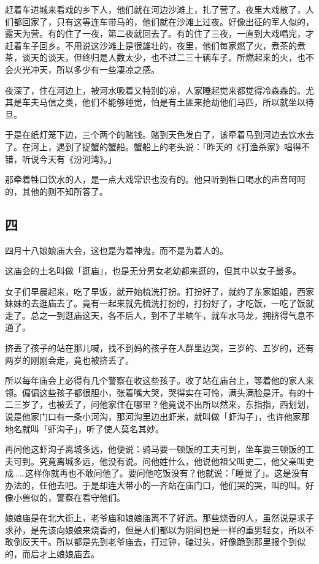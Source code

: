 \documentclass[UTF8]{ctexart}
\begin{document}
赶着车进城来看戏的乡下人，他们就在河边沙滩上，扎了营了。夜里大戏散了，人们都回家了，只有这等连车带马的，他们就在沙滩上过夜。好像出征的军人似的，露天为营。有的住了一夜，第二夜就回去了。有的住了三夜，一直到大戏唱完，才赶着车子回乡。不用说这沙滩上是很雄壮的，夜里，他们每家燃了火，煮茶的煮茶，谈天的谈天，但终归是人数太少，也不过二三十辆车子。所燃起来的火，也不会火光冲天，所以多少有一些凄凉之感。

夜深了，住在河边上，被河水吸着又特别的凉，人家睡起觉来都觉得冷森森的。尤其是车夫马信之类，他们不能够睡觉，怕是有土匪来抢劫他们马匹，所以就坐以待旦。

于是在纸灯笼下边，三个两个的赌钱。赌到天色发白了，该牵着马到河边去饮水去了。在河上，遇到了捉蟹的蟹船。蟹船上的老头说：「昨天的《打渔杀家》唱得不错，听说今天有《汾河湾》。」

那牵着牲口饮水的人，是一点大戏常识也没有的。他只听到牲口喝水的声音呵呵的，其他的则不知所答了。

\subsection{四}

四月十八娘娘庙大会，这也是为着神鬼，而不是为着人的。

这庙会的土名叫做「逛庙」，也是无分男女老幼都来逛的，但其中以女子最多。

女子们早晨起来，吃了早饭，就开始梳洗打扮。打扮好了，就约了东家姐姐，西家妹妹的去逛庙去了。竟有一起来就先梳洗打扮的，打扮好了，才吃饭，一吃了饭就走了。总之一到逛庙这天，各不后人，到不了半晌午，就车水马龙，拥挤得气息不通了。

挤丢了孩子的站在那儿喊，找不到妈的孩子在人群里边哭，三岁的、五岁的，还有两岁的刚刚会走，竟也被挤丢了。

所以每年庙会上必得有几个警察在收这些孩子。收了站在庙台上，等着他的家人来领。偏偏这些孩子都很胆小，张着嘴大哭，哭得实在可怜，满头满脸是汗。有的十二三岁了，也被丢了，问他家住在哪里？他竟说不出所以然来，东指指，西划划，说是他家门口有一条小河沟，那河沟里边出虾米，就叫做「虾沟子」，也许他家那地名就叫「虾沟子」，听了使人莫名其妙。

再问他这虾沟子离城多远，他便说：骑马要一顿饭的工夫可到，坐车要三顿饭的工夫可到。究竟离城多远，他没有说。问他姓什么，他说他祖父叫史二，他父亲叫史成……这样你就再也不敢问他了。要问他吃饭没有？他就说：「睡觉了」。这是没有办法的，任他去吧。于是却连大带小的一齐站在庙门口，他们哭的哭，叫的叫。好像小兽似的，警察在看守他们。

娘娘庙是在北大街上，老爷庙和娘娘庙离不了好远。那些烧香的人，虽然说是求子求孙，是先该向娘娘来烧香的，但是人们都以为阴间也是一样的重男轻女，所以不敢倒反天干。所以都是先到老爷庙去，打过钟，磕过头，好像跪到那里报个到似的，而后才上娘娘庙去。
\end{document}
